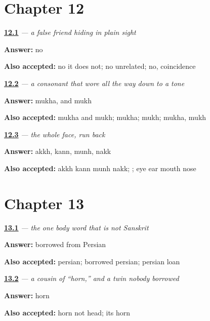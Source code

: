 \section*{Chapter 12}

\noindent\begin{minipage}[t]{\linewidth}
\raggedright
\hyperlink{review-PA-C12-kann-false-friend}{\textbf{12.1}} \emph{ — a false friend hiding in plain sight}\par
\small \textbf{Answer:} no\par
\footnotesize \textbf{Also accepted:} no it does not; no unrelated; no, coincidence
\end{minipage}\par\medskip

\noindent\begin{minipage}[t]{\linewidth}
\raggedright
\hyperlink{review-PA-C12-munh-tone}{\textbf{12.2}} \emph{ — a consonant that wore all the way down to a tone}\par
\small \textbf{Answer:} mukha, and mukh\par
\footnotesize \textbf{Also accepted:} mukha and mukh; mukha; mukh; mukha, mukh
\end{minipage}\par\medskip

\noindent\begin{minipage}[t]{\linewidth}
\raggedright
\hyperlink{review-PA-C12-nakk-face}{\textbf{12.3}} \emph{ — the whole face, run back}\par
\small \textbf{Answer:} akkh, kann, munh, nakk\par
\footnotesize \textbf{Also accepted:} akkh kann munh nakk;    ; eye ear mouth nose
\end{minipage}\par\medskip

\section*{Chapter 13}

\noindent\begin{minipage}[t]{\linewidth}
\raggedright
\hyperlink{review-PA-C13-dil-source}{\textbf{13.1}} \emph{ — the one body word that is not Sanskrit}\par
\small \textbf{Answer:} borrowed from Persian\par
\footnotesize \textbf{Also accepted:} persian; borrowed persian; persian loan
\end{minipage}\par\medskip

\noindent\begin{minipage}[t]{\linewidth}
\raggedright
\hyperlink{review-PA-C13-sir-cousin}{\textbf{13.2}} \emph{ — a cousin of \textquotedblleft{}horn,\textquotedblright{} and a twin nobody borrowed}\par
\small \textbf{Answer:} horn\par
\footnotesize \textbf{Also accepted:} horn not head; its horn
\end{minipage}\par\medskip
